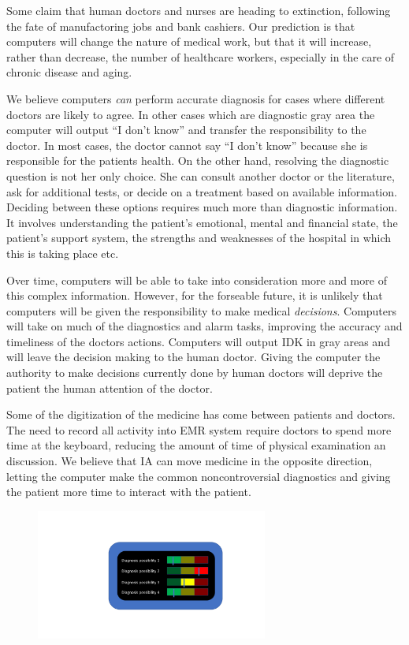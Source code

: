 \documentclass[12pt]{article}
\begin{document}
  Some claim that human doctors and nurses are heading to extinction,
  following the fate of manufactoring jobs and bank cashiers.  Our prediction is
  that computers will change the nature of medical work, but that it
  will increase, rather than decrease, the number of healthcare
  workers, especially in the care of chronic disease and aging.

  We believe computers {\em can} perform accurate diagnosis for cases where
  different doctors are likely to agree. In other cases which are
  diagnostic gray area the computer will output ``I don't know'' and
  transfer the responsibility to the doctor. In most cases, the doctor
  cannot say ``I don't know'' because she is responsible for the
  patients health. On the other hand, resolving the diagnostic
  question is not her only choice. She can consult another doctor or
  the literature, ask for additional tests, or decide on a treatment
  based on available information. Deciding between these options requires much
  more than diagnostic information. It involves understanding the
  patient's emotional, mental and financial state, the patient's
  support system, the strengths and weaknesses of the hospital in
  which this is taking place etc.

  Over time, computers will be able to take into consideration more
  and more of this complex information. However, for the forseable
  future, it is unlikely that computers will be given the
  responsibility to make medical {\em decisions}. Computers
  will take on much of the diagnostics and alarm tasks, improving the
  accuracy and timeliness of the doctors actions. Computers will
  output IDK in gray areas and will leave the decision making to the
  human doctor. Giving the computer the authority to make decisions
  currently done by human doctors will deprive the patient the human
  attention of the doctor.

  Some of the digitization of the medicine has come between patients
  and doctors. The need to record all activity into EMR system require
  doctors to spend more time at the keyboard, reducing the amount of
  time of physical examination an discussion. We believe that IA can
  move medicine in the opposite direction, letting the computer make
  the common noncontroversial diagnostics and giving the patient more
  time to interact with the patient.

\begin{figure}[h]
\begin{center}
\includegraphics[width=3in]{figures/RedYellowGreen.pdf}
\end{center}
\end{figure}
\end{document}
